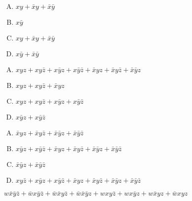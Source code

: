 {{        %
        \begin{practices}
            \begin{enumerate}[A.]
                \item $xy + \bar{x}y + \bar{x}\bar{y}$
                \item $x\bar{y}$
                \item $xy + \bar{x}y + \bar{x}\bar{y}$
                \item $x\bar{y} + \bar{x}\bar{y}$
            \end{enumerate}
        \end{practices}

        \begin{practices}
            \begin{enumerate}[A.]
                \item $xyz + xy\bar{z} + x\bar{y}z + x\bar{y}\bar{z} + \bar{x}yz + \bar{x}y\bar{z} + \bar{x}\bar{y}z$
                \item $xyz + xy\bar{z} + \bar{x}yz$
                \item $xyz + xy\bar{z} + x\bar{y}z + x\bar{y}\bar{z}$
                \item $x\bar{y}z + x\bar{y}\bar{z}$
            \end{enumerate}
        \end{practices}

        \begin{practices}
            \begin{enumerate}[A.]
                \item $\bar{x}yz + \bar{x}y\bar{z} + \bar{x}\bar{y}z + \bar{x}\bar{y}\bar{z}$
                \item $x\bar{y}z + x\bar{y}\bar{z} + \bar{x}yz + \bar{x}y\bar{z} + \bar{x}\bar{y}z + \bar{x}\bar{y}\bar{z}$
                \item $\bar{x}\bar{y}z + \bar{x}\bar{y}\bar{z}$
                \item $xy\bar{z} + x\bar{y}z + x\bar{y}\bar{z} + \bar{x}yz + \bar{x}y\bar{z} + \bar{x}\bar{y}z + \bar{x}\bar{y}\bar{z}$
            \end{enumerate}
        \end{practices}

        \begin{practices}
            $w\bar{x}\bar{y}\bar{z} + \bar{w}x\bar{y}\bar{z} + \bar{w}\bar{x}y\bar{z} + \bar{w}\bar{x}\bar{y}z + wxy\bar{z} + wx\bar{y}z + w\bar{x}yz + \bar{w}xyz$
        \end{practices}

}}
